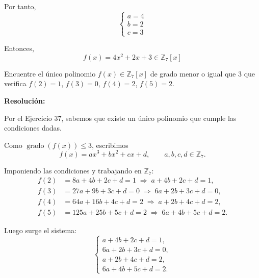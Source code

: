 \documentclass[a4paper,12pt]{article}
\begin{document}
\begin{ejercicio}[title=Ejercicio 38]
Por tanto,
\[
\begin{cases}
    a = 4 \\
    b = 2 \\ 
    c = 3
\end{cases}
\]

Entonces,
\[
\boxed{f(x)=4x^2+2x+3 \in \mathbb{Z}_7[x]}
\]

\end{ejercicio}

\begin{ejercicio}[title=Ejercicio 39]
Encuentre el único polinomio $f(x) \in \mathbb{Z}_7[x]$ de grado menor o igual que 3 que verifica $f(2)=1$, $f(3)=0$, $f(4)=2$, $f(5)=2$.

\tcblower
\textbf{Resolución:}

Por el Ejercicio 37, sabemos que existe un único polinomio que cumple las condiciones dadas.

Como $\operatorname{grado}(f(x))\le 3$, escribimos
\[
f(x)=ax^3+bx^2+cx+d,\qquad a,b,c,d\in\mathbb{Z}_7.
\]

Imponiendo las condiciones y trabajando en $\mathbb{Z}_7$:
\[
\begin{aligned}
f(2)&=8a+4b+2c+d=1 \;\Rightarrow\; a+4b+2c+d=1,\\
f(3)&=27a+9b+3c+d=0 \;\Rightarrow\; 6a+2b+3c+d=0,\\
f(4)&=64a+16b+4c+d=2 \;\Rightarrow\; a+2b+4c+d=2,\\
f(5)&=125a+25b+5c+d=2 \;\Rightarrow\; 6a+4b+5c+d=2.
\end{aligned}
\]

Luego surge el sistema:
\[
\begin{cases}
a+4b+2c+d=1,\\
6a+2b+3c+d=0,\\
a+2b+4c+d=2,\\
6a+4b+5c+d=2.
\end{cases}
\]


\end{ejercicio}
\end{document}

